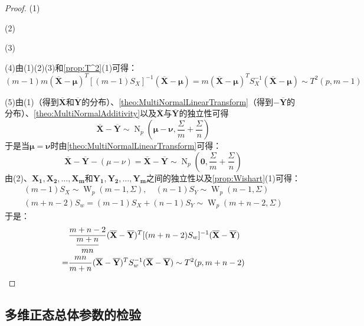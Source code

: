 \begin{proof}
	(1)\par
	(2)\par
	(3)\par
	(4)由(1)(2)(3)和\cref{prop:T^2}(1)可得：
	\begin{equation*}
		(m-1)m(\overline{\mathbf{X}}-\boldsymbol{\mu})^T[(m-1)S_X]^{-1}(\overline{\mathbf{X}}-\boldsymbol{\mu})=m(\overline{\mathbf{X}}-\boldsymbol{\mu})^TS_X^{-1}(\overline{\mathbf{X}}-\boldsymbol{\mu})\sim T^2(p,m-1)
	\end{equation*}\par
	(5)由(1)（得到$\overline{\mathbf{X}}$和$\overline{\mathbf{Y}}$的分布）、\cref{theo:MultiNormalLinearTransform}（得到$-\overline{\mathbf{Y}}$的分布）、\cref{theo:MultiNormalAdditivity}以及$\overline{\mathbf{X}}$与$\overline{\mathbf{Y}}$的独立性可得
	\begin{equation*}
		\overline{\mathbf{X}}-\overline{\mathbf{Y}}\sim \operatorname{N}_p\left(\boldsymbol{\mu}-\boldsymbol{\nu},\frac{\Sigma}{m}+\frac{\Sigma}{n}\right)
	\end{equation*}
	于是当$\boldsymbol{\mu}=\boldsymbol{\nu}$时由\cref{theo:MultiNormalLinearTransform}可得：
	\begin{equation*}
		\overline{\mathbf{X}}-\overline{\mathbf{Y}}-(\mu-\nu)=\overline{\mathbf{X}}-\overline{\mathbf{Y}}\sim \operatorname{N}_p\left(\mathbf{0},\frac{\Sigma}{m}+\frac{\Sigma}{n}\right)
	\end{equation*}
	由(2)、$\mathbf{X_1},\mathbf{X_2},\dots,\mathbf{X_m}$和$\mathbf{Y_1},\mathbf{Y_2},\dots,\mathbf{Y_m}$之间的独立性以及\cref{prop:Wishart}(1)可得：
	\begin{gather*}
		(m-1)S_X\sim\operatorname{W}_p(m-1,\Sigma),\quad(n-1)S_Y\sim\operatorname{W}_p(n-1,\Sigma) \\
		(m+n-2)S_w=(m-1)S_X+(n-1)S_Y\sim\operatorname{W}_p(m+n-2,\Sigma)
	\end{gather*}
	于是：
	\begin{align*}
		&\frac{m+n-2}{\dfrac{m+n}{mn}}(\overline{\mathbf{X}}-\overline{\mathbf{Y}})^T[(m+n-2)S_{w}]^{-1}(\overline{\mathbf{X}}-\overline{\mathbf{Y}}) \\
		=&\frac{mn}{m+n}(\overline{\mathbf{X}}-\overline{\mathbf{Y}})^TS_{w}^{-1}(\overline{\mathbf{X}}-\overline{\mathbf{Y}})\sim T^2(p,m+n-2)\qedhere
	\end{align*}
\end{proof}

\subsection{多维正态总体参数的检验}
